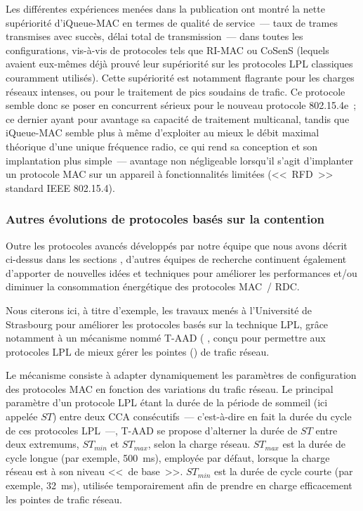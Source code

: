 Les différentes expériences menées dans la publication \cite{iQueueMAC}
ont montré la nette supériorité d'iQueue-MAC en termes de qualité de
service~--- taux de trames transmises avec succès, délai total de
transmission~--- dans toutes les configurations, vis-à-vis de protocoles
tels que RI-MAC ou CoSenS (lequels avaient eux-mêmes déjà prouvé leur
supériorité sur les protocoles LPL classiques couramment utilisés).
Cette supériorité est notamment flagrante pour les charges réseaux intenses,
ou pour le traitement de pics soudains de trafic. Ce protocole semble donc
se poser en concurrent sérieux pour le nouveau protocole 802.15.4e~;
ce dernier ayant pour avantage sa capacité de traitement multicanal, tandis
que iQueue-MAC semble plus à même d'exploiter au mieux le débit maximal
théorique d'une unique fréquence radio, ce qui rend sa conception
et son implantation plus simple~--- avantage non négligeable lorsqu'il
s'agit d'implanter un protocole MAC sur un appareil à fonctionnalités
limitées (<<~RFD~>> standard IEEE 802.15.4).

\subsubsection{Autres évolutions de protocoles basés sur la contention}
\label{ParProtoTNoel}

Outre les protocoles avancés développés par notre équipe que nous avons
décrit ci-dessus dans les sections ,
d'autres équipes de recherche continuent également d'apporter de
nouvelles idées et techniques pour améliorer les performances et/ou
diminuer la consommation énergétique des protocoles MAC~/ RDC.

\smallskip

Nous citerons ici, à titre d'exemple, les travaux menés à l'Université
de Strasbourg pour améliorer les protocoles basés sur la technique LPL,
grâce notamment à un mécanisme nommé T-AAD ( \cite{T-AAD}, conçu pour permettre aux protocoles LPL
de mieux gérer les pointes () de trafic réseau.

Le mécanisme  consiste à adapter dynamiquement les paramètres
de configuration des protocoles MAC en fonction des variations du trafic
réseau. Le principal paramètre d'un protocole LPL étant la durée de la
période de sommeil (ici appelée $ST$) entre deux CCA consécutifs~---
c'est-à-dire en fait la durée du cycle de ces protocoles LPL~---,
T-AAD se propose d'alterner la durée de $ST$ entre deux extremums,
$ST_{min}$ et $ST_{max}$, selon la charge réseau. $ST_{max}$ est la durée
de cycle longue (par exemple, 500~ms), employée par défaut, lorsque la
charge réseau est à son niveau <<~de base~>>. $ST_{min}$ est la durée
de cycle courte (par exemple, 32~ms), utilisée temporairement afin
de prendre en charge efficacement les pointes de trafic réseau.

